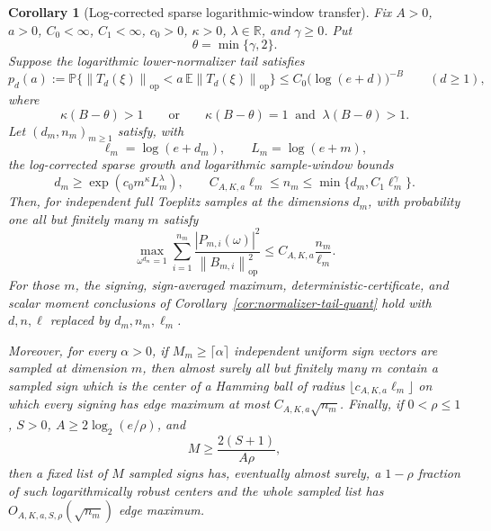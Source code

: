 \documentclass[11pt]{amsart}
\numberwithin{equation}{section}
\newtheorem{corollary}[theorem]{Corollary}
\theoremstyle{definition}
\theoremstyle{remark}
\newcommand{\op}{\mathrm{op}}
\newcommand{\Prob}{\mathbb P}
\newcommand{\Exp}{\mathbb E}
\newcommand{\norm}[1]{\left\lVert #1\right\rVert}
\newcommand{\abs}[1]{\left\lvert #1\right\rvert}
\begin{document}
\begin{corollary}[Log-corrected sparse logarithmic-window transfer]
\label{cor:normalizer-tail-borel-window-log-corrected}
Fix \(A>0\), \(a>0\), \(C_0<\infty\), \(C_1<\infty\), \(c_0>0\),
\(\kappa>0\), \(\lambda\in\mathbb R\), and \(\gamma\ge0\).  Put
\[
  \theta=\min\{\gamma,2\}.
\]
Suppose the logarithmic lower-normalizer tail satisfies
\[
  p_d(a):=\Prob\{\norm{T_d(\xi)}_{\op}<a\,\Exp\norm{T_d(\xi)}_{\op}\}
  \le C_0\bigl(\log(e+d)\bigr)^{-B}
  \qquad(d\ge1),
\]
where
\[
  \kappa(B-\theta)>1
  \qquad\text{or}\qquad
  \kappa(B-\theta)=1\ \text{ and }\ \lambda(B-\theta)>1 .
\]
Let \((d_m,n_m)_{m\ge1}\) satisfy, with
\[
  \ell_m=\log(e+d_m),\qquad L_m=\log(e+m),
\]
the log-corrected sparse growth and logarithmic sample-window bounds
\[
  d_m\ge\exp(c_0m^\kappa L_m^\lambda),
  \qquad
  C_{A,K,a}\ell_m\le n_m\le \min\{d_m,C_1\ell_m^\gamma\}.
\]
Then, for independent full Toeplitz samples at the dimensions \(d_m\), with
probability one all but finitely many \(m\) satisfy
\[
  \max_{\omega^{d_m}=1}
  \sum_{i=1}^{n_m}
  \frac{\abs{P_{m,i}(\omega)}^2}{\norm{B_{m,i}}_{\op}^2}
  \le C_{A,K,a}\frac{n_m}{\ell_m}.
\]
For those \(m\), the signing, sign-averaged maximum, deterministic-certificate,
and scalar moment conclusions of Corollary~\ref{cor:normalizer-tail-quant} hold
with \(d,n,\ell\) replaced by \(d_m,n_m,\ell_m\).

Moreover, for every \(\alpha>0\), if \(M_m\ge\lceil\alpha\rceil\) independent
uniform sign vectors are sampled at dimension \(m\), then almost surely all but
finitely many \(m\) contain a sampled sign which is the center of a Hamming ball
of radius \(\lfloor c_{A,K,a}\ell_m\rfloor\) on which every signing has edge
maximum at most \(C_{A,K,a}\sqrt{n_m}\).  Finally, if \(0<\rho\le1\),
\(S>0\), \(A\ge2\log_2(e/\rho)\), and
\[
  M\ge \frac{2(S+1)}{A\rho},
\]
then a fixed list of \(M\) sampled signs has, eventually almost surely, a
\(1-\rho\) fraction of such logarithmically robust centers and the whole sampled
list has \(O_{A,K,a,S,\rho}(\sqrt{n_m})\) edge maximum.
\end{corollary}
\end{document}
